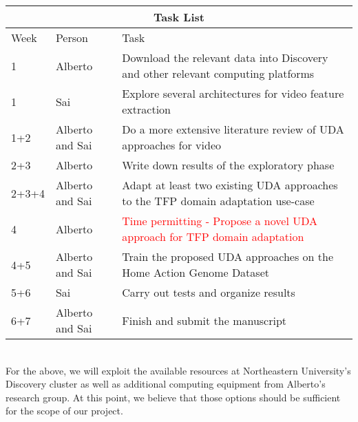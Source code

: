 \documentclass[final]{cvpr}
\begin{document}
\begin{tabular}{ |p{0.8cm}|p{1.1cm}|p{4.8cm}| }
\hline
\multicolumn{3}{|c|}{Task List} \\
\hline
Week & Person & Task\\
\hline
1 & Alberto & Download the relevant data into Discovery and other relevant computing platforms \\
\hline
1 & Sai & Explore several architectures for video feature extraction\\
\hline
1+2 & Alberto and Sai & Do a more extensive literature review of UDA approaches for video \\
\hline
2+3 & Alberto & Write down results of the exploratory phase\\
\hline
2+3+4 & Alberto and Sai & Adapt at least two existing UDA approaches to the TFP domain adaptation use-case\\
\hline
4 & Alberto & \textcolor{red}{Time permitting - Propose a novel UDA approach for TFP domain adaptation}\\
\hline
4+5 & Alberto and Sai & Train the proposed UDA approaches on the Home Action Genome Dataset\\
\hline
5+6 & Sai & Carry out tests and organize results\\
\hline
6+7 & Alberto and Sai & Finish and submit the manuscript\\
\hline
\end{tabular}
\\

For the above, we will exploit the available resources at Northeastern University's Discovery cluster as well as additional computing equipment from Alberto's research group. At this point, we believe that those options should be sufficient for the scope of our project. 



{\small


}
\end{document}

